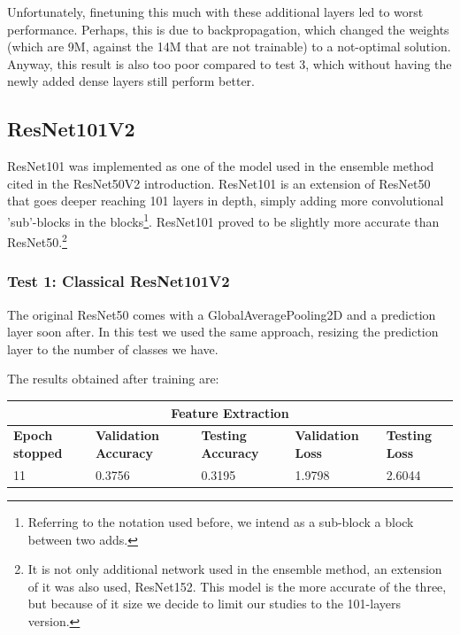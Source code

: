 Unfortunately, finetuning this much with these additional layers led to worst performance. Perhaps, this is due to backpropagation, which changed the weights (which are 9M, against the 14M that are not trainable) to a not-optimal solution. Anyway, this result is also too poor compared to test 3, which without having the newly added dense layers still perform better.







\subsection{ResNet101V2}
ResNet101 was implemented as one of the model used in the ensemble method cited in the ResNet50V2 introduction. ResNet101 is an extension of ResNet50 that goes deeper reaching 101 layers in depth, simply adding more convolutional 'sub'-blocks in the blocks\footnote{Referring to the notation used before, we intend as a sub-block a block between two adds.}. ResNet101 proved to be slightly more accurate than ResNet50.\footnote{It is not only additional network used in the ensemble method, an extension of it was also used, ResNet152. This model is the more accurate of the three, but because of it size we decide to limit our studies to the 101-layers version.}

\subsubsection{Test 1: Classical ResNet101V2}
The original ResNet50 comes with a GlobalAveragePooling2D and a prediction layer soon after. In this test we used the same approach, resizing the prediction layer to the number of classes we have.

\noindent The results obtained after training are:

\medskip

\begin{tabular}{ |p{2cm}|p{2cm}|p{2cm}|p{2cm}|p{2cm}|  }
\hline
\multicolumn{5}{|c|}{Feature Extraction} \\
\hline
\textbf{Epoch stopped} & \textbf{Validation Accuracy} & \textbf{Testing Accuracy} & \textbf{Validation Loss} & \textbf{Testing Loss} \\
\hline
11 & 0.3756 & 0.3195 & 1.9798 & 2.6044\\
\hline
\end{tabular}

